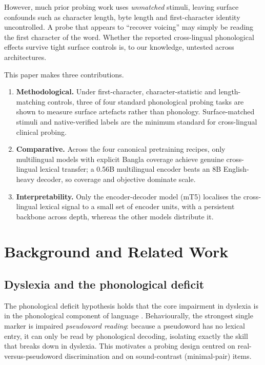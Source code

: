 \documentclass[conference]{IEEEtran}
\begin{document}
However, much prior probing work uses \emph{unmatched} stimuli, leaving surface confounds such as character length, byte length and first-character identity uncontrolled. A probe that appears to ``recover voicing'' may simply be reading the first character of the word. Whether the reported cross-lingual phonological effects survive tight surface controls is, to our knowledge, untested across architectures.

This paper makes three contributions.
\begin{enumerate}
\item \textbf{Methodological.} Under first-character, character-statistic and length-matching controls, three of four standard phonological probing tasks are shown to measure surface artefacts rather than phonology. Surface-matched stimuli and native-verified labels are the minimum standard for cross-lingual clinical probing.
\item \textbf{Comparative.} Across the four canonical pretraining recipes, only multilingual models with explicit Bangla coverage achieve genuine cross-lingual lexical transfer; a 0.56B multilingual encoder beats an 8B English-heavy decoder, so coverage and objective dominate scale.
\item \textbf{Interpretability.} Only the encoder-decoder model (mT5) localises the cross-lingual lexical signal to a small set of encoder units, with a persistent backbone across depth, whereas the other models distribute it.
\end{enumerate}

\section{Background and Related Work}
\subsection{Dyslexia and the phonological deficit}
The phonological deficit hypothesis holds that the core impairment in dyslexia is in the phonological component of language \cite{snowling2020dyslexia,goswami2011temporal}. Behaviourally, the strongest single marker is impaired \emph{pseudoword reading}: because a pseudoword has no lexical entry, it can only be read by phonological decoding, isolating exactly the skill that breaks down in dyslexia. This motivates a probing design centred on real-versus-pseudoword discrimination and on sound-contrast (minimal-pair) items.
\end{document}
